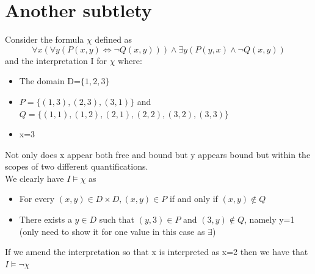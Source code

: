 \documentclass{article}[18pt]
\begin{document}
\section{Another subtlety}
Consider the formula $\chi$ defined as
$$\forall x ( \forall y ( P ( x , y ) \Leftrightarrow \neg Q ( x , y ) ) ) \wedge \exists y ( P ( y , x ) \wedge \neg Q ( x , y ) )$$
and the interpretation I for $\chi$ where:
\begin{itemize}
\item The domain D=$\{1,2,3\}$
\item $P = \{ ( 1,3 ) , ( 2,3 ) , ( 3,1 ) \}$ and $Q = \{ ( 1,1 ) , ( 1,2 ) , ( 2,1 ) , ( 2,2 ) , ( 3,2 ) , ( 3,3 ) \}$
\item x=3
\end{itemize}
Not only does x appear both free and bound but y appears bound but within the scopes of two different quantifications.\\
We clearly have $I\models \chi$ as
\begin{itemize}
\item For every $(x,y)\in D\times D, (x,y)\in P$ if and only if $(x,y)\not\in Q$
\item There exists a $y\in D$ such that $(y,3)\in P$ and $(3,y)\not\in Q$, namely y=1 (only need to show it for one value in this case as $\exists$)
\end{itemize}
If we amend the interpretation so that x is interpreted as x=2 then we have that $I\models \lnot \chi$
\end{document}
